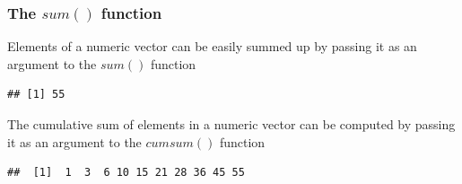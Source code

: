 \documentclass[12pt]{book}\usepackage{knitr}
\begin{document}
\subsubsection{The $sum()$ function}
\noindent Elements of a numeric vector can be easily summed up by passing it as an argument to the $sum()$ function
\begin{knitrout}
\color{fgcolor}\begin{kframe}
\begin{alltt}
\hlkwb{<-}\hlopt{:} 
 
\end{alltt}
\begin{verbatim}
## [1] 55
\end{verbatim}
\end{kframe}
\end{knitrout}
\noindent The cumulative sum of elements in a numeric vector can be computed by passing it as an argument to the $cumsum()$ function
\begin{knitrout}
\color{fgcolor}\begin{kframe}
\begin{alltt}
\hlkwb{<-}\hlopt{:} 
 
\end{alltt}
\begin{verbatim}
##  [1]  1  3  6 10 15 21 28 36 45 55
\end{verbatim}
\end{kframe}
\end{knitrout}
\end{document}
